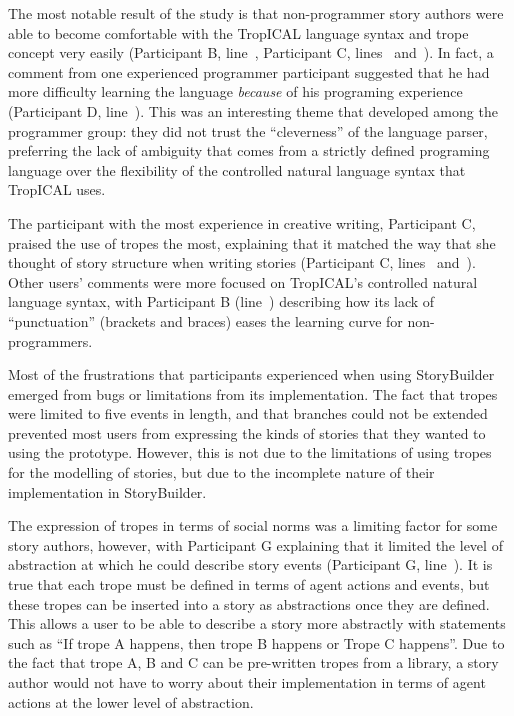 \documentclass[11pt]{report}
\begin{document}
The most notable result of the study is that non-programmer story authors were able
to become comfortable with the TropICAL language syntax and trope concept very
easily (Participant B, line~, Participant C,
lines~ and~). In fact, a comment from one experienced programmer participant
suggested that he had more difficulty learning the language
\emph{because} of his programing experience (Participant D,
line~). This was an interesting theme that developed among
the programmer group: they did not trust the ``cleverness'' of the language
parser, preferring the lack of ambiguity that comes from a strictly defined
programing language over the flexibility of the controlled natural language
syntax that TropICAL uses.

The participant with the most experience in creative writing, Participant C,
praised the use of tropes the most, explaining that it matched the way that she
thought of story structure when writing stories (Participant C,
lines~ and~). Other users' comments were
more focused on TropICAL's controlled natural language syntax, with Participant B
(line~) describing how its lack of ``punctuation'' (brackets
and braces) eases the learning curve for non-programmers.

Most of the frustrations that participants experienced when using StoryBuilder
emerged from bugs or limitations from its implementation. The fact that tropes
were limited to five events in length, and that branches could not be extended
prevented most users from expressing the kinds of stories that they wanted to
using the prototype. However, this is not due to the limitations of using tropes
for the modelling of stories, but due to the incomplete nature of their
implementation in StoryBuilder.

The expression of tropes in terms of social norms was a limiting factor for some
story authors, however, with Participant G explaining that it limited the level
of abstraction at which he could describe story events (Participant G,
line~). It is true that each trope must be defined in
terms of agent actions and events, but these tropes can be inserted into a story
as abstractions once they are defined. This allows a user to be able to describe
a story more abstractly with statements such as ``If trope A happens, then trope
B happens or Trope C happens''. Due to the fact that trope A, B and C can be
pre-written tropes from a library, a story author would not have to worry about
their implementation in terms of agent actions at the lower level of abstraction.
\end{document}
